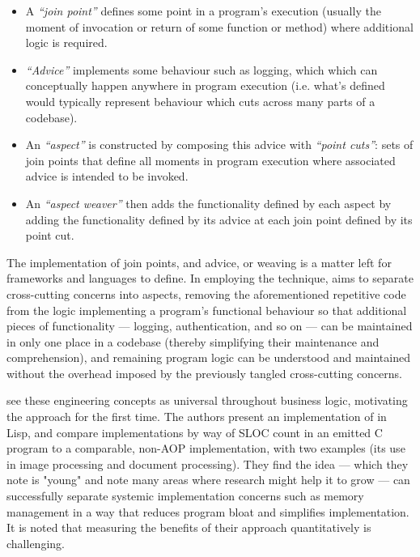\begin{itemize}
    \item A \emph{``join point''} defines some point in a program's execution
    (usually the moment of invocation or return of some function or method)
    where additional logic is required.
    \item \emph{``Advice''} implements some behaviour such as logging, which
    which can conceptually happen anywhere in program execution (i.e. what's
    defined would typically represent behaviour which cuts across many parts of
    a codebase).
    \item An \emph{``aspect''} is constructed by composing this advice with
    \emph{``point cuts''}: sets of join points that define all moments in
    program execution where associated advice is intended to be invoked.
    \item An \emph{``aspect weaver''} then adds the functionality defined by
    each aspect by adding the functionality defined by its advice at each join
    point defined by its point cut.
\end{itemize}

The implementation of join points, and advice, or weaving is a matter left for
\aspectorientation{} frameworks and \aspectoriented{} languages to define. In
employing the technique, \aop{} aims to separate cross-cutting concerns into
aspects, removing the aforementioned repetitive code from the logic implementing
a program's functional behaviour so that additional pieces of functionality ---
logging, authentication, and so on --- can be maintained in only one place in a
codebase (thereby simplifying their maintenance and comprehension), and
remaining program logic can be understood and maintained without the overhead
imposed by the previously tangled cross-cutting concerns.

\citet{kiczales1997aspect} see these engineering concepts as universal
throughout business logic, motivating the \aspectoriented{} approach for the
first time. The authors present an implementation of \aop{} in Lisp, and compare
implementations by way of SLOC count in an emitted C program to a comparable,
non-AOP implementation, with two examples (its use in image processing and
document processing). They find the idea --- which they note is "young" and note
many areas where research might help it to grow --- can successfully separate
systemic implementation concerns such as memory management in a way that reduces
program bloat and simplifies implementation. It is noted that measuring the
benefits of their approach quantitatively is challenging.

